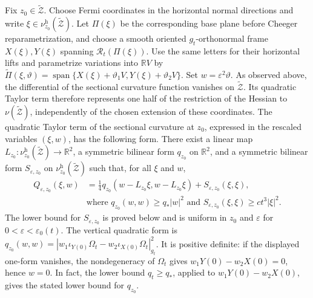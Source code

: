 \documentclass[11pt]{article}
\theoremstyle{definition}
\theoremstyle{remark}
\newcommand{\R}{\mathbb R}
\newcommand{\tZ}{\widetilde{\mathcal Z}}
\newcommand{\Span}{\operatorname{span}}
\newcommand{\eps}{\varepsilon}
\begin{document}
Fix $z_0\in\tZ$.  Choose Fermi coordinates in the horizontal normal
directions and write $\xi\in\nu^{\mathrm h}_{z_0}(\tZ)$.  Let $\Pi(\xi)$ be
the corresponding base plane before Cheeger reparametrization, and choose a
smooth oriented $g_t$-orthonormal frame $X(\xi),Y(\xi)$ spanning
$\mathcal R_t(\Pi(\xi))$.  Use the same letters for their horizontal lifts
and parametrize variations into $\R V$ by
$\widetilde\Pi(\xi,\vartheta)=
\Span\{X(\xi)+\vartheta_1V,Y(\xi)+\vartheta_2V\}$.
Set $w=\eps^2\vartheta$.  As observed above, the differential of the
sectional curvature function vanishes on $\tZ$.  Its quadratic Taylor term
therefore represents one half of the restriction of the Hessian to
$\nu(\tZ)$, independently of the chosen extension of these coordinates.
The quadratic Taylor term of the
sectional curvature at $z_0$, expressed in the rescaled variables
$(\xi,w)$, has the following form.  There exist a linear map
$L_{z_0}:\nu^{\mathrm h}_{z_0}(\tZ)\to\R^2$, a symmetric bilinear form
$q_{z_0}$ on $\R^2$, and a symmetric bilinear form $S_{\eps,z_0}$ on
$\nu^{\mathrm h}_{z_0}(\tZ)$ such that, for all $\xi$ and $w$,
\begin{equation}                                                                    \label{eq:normal-hessian-square}
 \begin{aligned}
 Q_{\eps,z_0}(\xi,w)&=\frac14q_{z_0}(w-L_{z_0}\xi,w-L_{z_0}\xi)+S_{\eps,z_0}(\xi,\xi),\\
 &\text{where }q_{z_0}(w,w)\geq q_*|w|^2\text{ and }
 S_{\eps,z_0}(\xi,\xi)\geq ct^3|\xi|^2.
 \end{aligned}
\end{equation}
The lower bound for $S_{\eps,z_0}$ is proved below and is uniform in $z_0$
and $\eps$ for $0<\eps<\eps_0(t)$.  The vertical quadratic form is
$q_{z_0}(w,w)=
|w_1\iota_{Y(0)}\Omega_t-w_2\iota_{X(0)}\Omega_t|_{g_t}^2$.
It is positive definite: if the displayed one-form
vanishes, the nondegeneracy of $\Omega_t$ gives
$w_1Y(0)-w_2X(0)=0$, hence $w=0$.  In fact, the lower bound $q_t\geq q_*$,
applied to $w_1Y(0)-w_2X(0)$, gives the stated lower bound for $q_{z_0}$.
\end{document}
